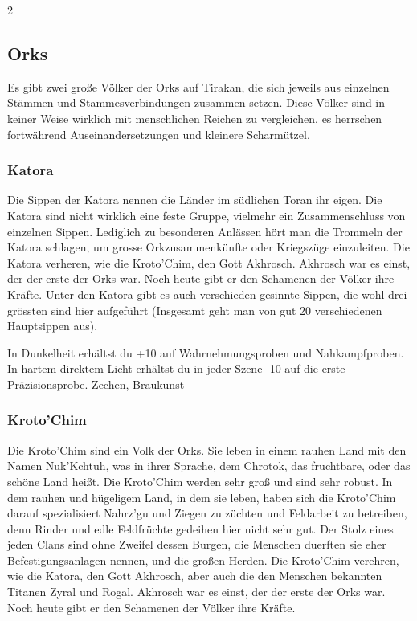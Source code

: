 {\begin{multicols*}{2}
        \subsection{Orks}\label{subsec:abstammungen-orks}

        Es gibt zwei große Völker der Orks auf Tirakan, die sich jeweils aus einzelnen Stämmen und Stammesverbindungen zusammen setzen. Diese Völker sind in keiner Weise wirklich mit menschlichen Reichen zu vergleichen, es herrschen fortwährend Auseinandersetzungen und kleinere Scharmützel.

        \subsubsection*{Katora}
        Die Sippen der Katora nennen die Länder im südlichen Toran ihr eigen. Die Katora sind nicht wirklich eine feste Gruppe, vielmehr ein Zusammenschluss von einzelnen Sippen. Lediglich zu besonderen Anlässen hört man die Trommeln der Katora schlagen, um grosse Orkzusammenkünfte oder Kriegszüge einzuleiten. Die Katora verheren, wie die Kroto'Chim, den Gott Akhrosch. Akhrosch war es einst, der der erste der Orks war. Noch heute gibt er den Schamenen der Völker ihre Kräfte. Unter den Katora gibt es auch verschieden gesinnte Sippen, die wohl drei grössten sind hier aufgeführt (Insgesamt geht man von gut 20 verschiedenen Hauptsippen aus).

        \abstammungspielwertebox
        {In Dunkelheit erhältst du +10 auf Wahrnehmungsproben und Nahkampfproben.}
        {In hartem direktem Licht erhältst du in jeder Szene -10 auf die erste Präzisionsprobe.}
        {Zechen, Braukunst}

        \subsubsection*{Kroto'Chim}
        Die Kroto'Chim sind ein Volk der Orks. Sie leben in einem rauhen Land mit den Namen Nuk'Kchtuh, was in ihrer Sprache, dem Chrotok, das fruchtbare, oder das schöne Land heißt. Die Kroto'Chim werden sehr groß und sind sehr robust. In dem rauhen und hügeligem Land, in dem sie leben, haben sich die Kroto'Chim darauf spezialisiert Nahrz'gu und Ziegen zu züchten und Feldarbeit zu betreiben, denn Rinder und edle Feldfrüchte gedeihen hier nicht sehr gut. Der Stolz eines jeden Clans sind ohne Zweifel dessen Burgen, die Menschen duerften sie eher Befestigungsanlagen nennen, und die großen Herden. Die Kroto'Chim verehren, wie die Katora, den Gott Akhrosch, aber auch die den Menschen bekannten Titanen Zyral und Rogal. Akhrosch war es einst, der der erste der Orks war. Noch heute gibt er den Schamenen der Völker ihre Kräfte.


\end{multicols*}}
